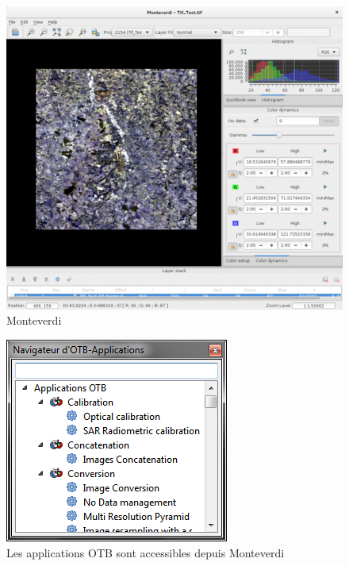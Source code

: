 \documentclass[10pt,a4paper]{article}
\begin{document}
\begin{figure}[h]
  \center
  \includegraphics[width=1\textwidth]{Art/monteverdi-tif.png}
  \caption[]{Monteverdi}
  \label{fig:monteverdi}
\end{figure}

\begin{figure}[h]
  \center
  \includegraphics[scale=1]{Art/windows-mapla.png}
  \caption[]{Les applications OTB sont accessibles depuis Monteverdi}
  \label{fig:windows-mapla}
\end{figure}
\end{document}
